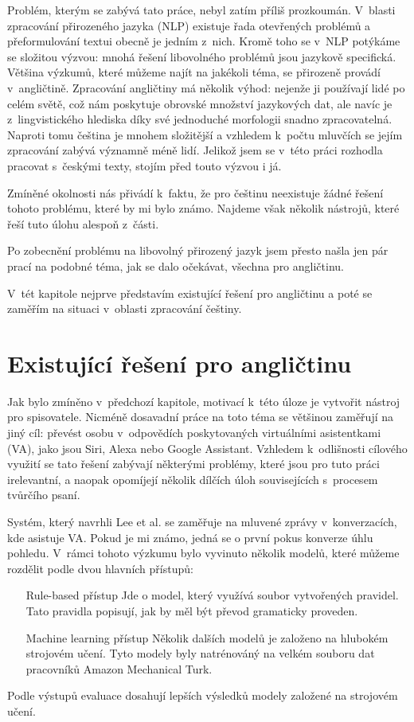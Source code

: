 Problém, kterým se zabývá tato práce, nebyl zatím příliš prozkoumán. V~blasti zpracování přirozeného jazyka (NLP) existuje řada otevřených problémů a přeformulování textui obecně je jedním z~nich. Kromě toho se v~NLP potýkáme se složitou výzvou: mnohá řešení libovolného problémů jsou jazykově specifická. Většina výzkumů, které můžeme najít na jakékoli téma, se přirozeně provádí v~angličtině. Zpracování angličtiny má několik výhod: nejenže ji používají lidé po celém světě, což nám poskytuje obrovské množství jazykových dat, ale navíc je z~lingvistického hlediska díky své jednoduché morfologii snadno zpracovatelná. Naproti tomu čeština je mnohem složitější a vzhledem k~počtu mluvčích se jejím zpracování zabývá významně méně lidí. Jelikož jsem se v~této práci rozhodla pracovat s~českými texty, stojím před touto výzvou i já.

Zmíněné okolnosti nás přivádí k~faktu, že pro češtinu neexistuje žádné řešení tohoto problému, které by mi bylo známo. Najdeme však několik nástrojů, které řeší tuto úlohu alespoň z~části.

Po zobecnění problému na libovolný přirozený jazyk jsem přesto našla jen pár prací na podobné téma, jak se dalo očekávat, všechna pro angličtinu.

V~tét kapitole nejprve představím existující řešení pro angličtinu a poté se zaměřím na situaci v~oblasti zpracování češtiny.

\section{Existující řešení pro angličtinu}

Jak bylo zmíněno v~předchozí kapitole, motivací k~této úloze je vytvořit nástroj pro spisovatele. Nicméně dosavadní práce na toto téma se většinou zaměřují na jiný cíl: převést osobu v~odpovědích poskytovaných virtuálními asistentkami (VA), jako jsou Siri, Alexa nebo Google Assistant. Vzhledem k~odlišnosti cílového využití se tato řešení zabývají některými problémy, které jsou pro tuto práci irelevantní, a naopak opomíjejí několik dílčích úloh souvisejících s~procesem tvůrčího psaní.

Systém, který navrhli Lee et al. \cite{lee2020converting} se zaměřuje na mluvené zprávy v~konverzacích, kde asistuje VA. Pokud je mi známo, jedná se o první pokus konverze úhlu pohledu. V~rámci tohoto výzkumu bylo vyvinuto několik modelů, které můžeme rozdělit podle dvou hlavních přístupů:

\begin{itemize}
	\item[Rule-based přístup] Jde o model, který využívá soubor vytvořených pravidel. Tato pravidla popisují, jak by měl být převod gramaticky proveden.
	\item[Machine learning přístup] Několik dalších modelů je založeno na hlubokém strojovém učení. Tyto modely byly natrénováný na velkém souboru dat pracovníků Amazon Mechanical Turk.
\end{itemize}
Podle výstupů evaluace dosahují lepších výsledků modely založené na strojovém učení.


